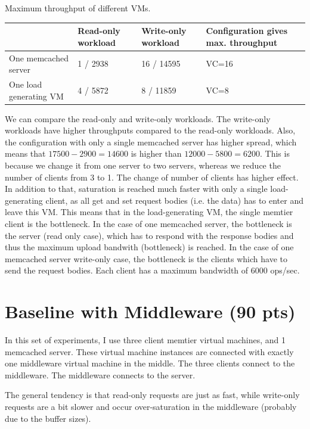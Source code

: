\documentclass[11pt,a4paper]{article}
\begin{document}
\begin{center}
	{Maximum throughput of different VMs.}
	\begin{tabular}{|l|p{2cm}|p{2cm}|p{4cm}|}
		\hline                        & Read-only workload & Write-only workload & Configuration gives max. throughput \\ 
		\hline One memcached server   & 1  / 2938 & 16 / 14595 & VC=16  \\ 
		\hline One load generating VM & 4  / 5872 & 8 / 11859 & VC=8 \\ 
		\hline 
	\end{tabular}
\end{center}

We can compare the read-only and write-only workloads.
The write-only workloads have higher throughputs compared to the read-only workloads.
Also, the configuration with only a single memcached server has higher spread, which means that $17500 - 2900 = 14600$ is higher than $12000 - 5800 = 6200$. 
This is because we change it from one server to two servers, whereas we reduce the number of clients from 3 to 1.
The change of number of clients has higher effect.
In addition to that, saturation is reached much faster with only a single load-generating client, as all get and set request bodies (i.e. the data) has to enter and leave this VM.
This means that in the load-generating VM, the single memtier client is the bottleneck.
In the case of one memcached server, the bottleneck is the server (read only case), which has to respond with the response bodies and thus the maximum upload bandwith (bottleneck) is reached.
In the case of one memcached server write-only case, the bottleneck is the clients which have to send the request bodies.
Each client has a maximum bandwidth of 6000 ops/sec.

\section{Baseline with Middleware (90 pts)}

In this set of experiments, I use three client memtier virtual machines, and 1 memcached server.
These virtual machine instances are connected with exactly one middleware virtual machine in the middle.
The three clients connect to the middleware. 
The middleware connects to the server.

The general tendency is that read-only requests are just as fast,
while write-only requests are a bit slower and occur over-saturation in the middleware (probably due to the buffer sizes).
\end{document}
